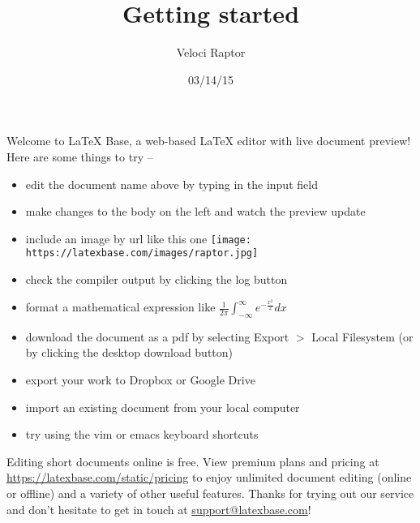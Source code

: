 \documentclass[12pt]{article}
\title{Getting started}
\author{Veloci Raptor}
\date{03/14/15}
\begin{document}
\maketitle

Welcome to LaTeX Base, a web-based \LaTeX{} editor with live document preview!
Here are some things to try --

\begin{itemize}
  \item edit the document name above by typing in the input field
  \item make changes to the body on the left and watch the preview update
  \item include an image by url like this one
        \hspace*{3em}
        \texttt{[image: https://latexbase.com/images/raptor.jpg]}
  \item check the compiler output by clicking the log button
  \item format a mathematical expression like
        $\frac{1}{2\pi}\int_{-\infty}^{\infty}e^{-\frac{x^2}{2}}dx$
  \item download the document as a pdf by selecting Export $>$ Local
        Filesystem (or by clicking the desktop download button)
  \item export your work to Dropbox or Google Drive
  \item import an existing document from your local computer
  \item try using the vim or emacs keyboard shortcuts
\end{itemize}

Editing short documents online is free. View premium plans and pricing at
\url{https://latexbase.com/static/pricing} to enjoy unlimited document editing
(online or offline) and a variety of other useful features. Thanks for trying
out our service and don't hesitate to get in touch at
\href{mailto:support@latexbase.com}{support@latexbase.com}!
\end{document}
